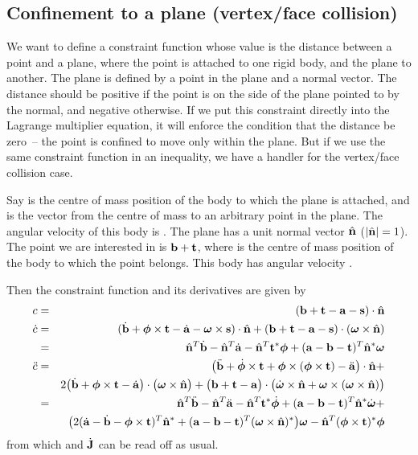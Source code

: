 \subsection{Confinement to a plane (vertex/face collision) \label{vertexFaceConstraint}}

We want to define a constraint function whose value is the distance between a point
and a plane, where the point is attached to one rigid body, and the plane to another. The plane
is defined by a point in the plane and a normal vector. The distance should be positive if the
point is on the side of the plane pointed to by the normal, and negative otherwise.
If we put this constraint directly into the Lagrange multiplier equation, it will enforce the
condition that the distance be zero~-- the point is confined to move only within the plane.
But if we use the same constraint function in an inequality, we have a handler for the
vertex/face collision case.

Say  is the centre of mass position of the body to which the plane is attached, and 
is the vector from the centre of mass to an arbitrary point in the plane. The angular velocity
of this body is \ve{\omega}. The plane has a unit normal vector $\hat{\ve{n}}$
($\norm{\hat{\ve{n}}} = 1$). The point we are interested in is $\ve{b} + \ve{t}$, where  is
the centre of mass position of the body to which the point belongs. This body has angular
velocity \ve{\phi}.

Then the constraint function and its derivatives are given by
\begin{eqnarray}
c &=& (\ve{b} + \ve{t} - \ve{a} - \ve{s})\cdot\hat{\ve{n}} \\
\dot{c} &=& (\dot{\ve{b}} + \ve{\phi}\times\ve{t} - \dot{\ve{a}} - \ve{\omega}\times\ve{s})
    \cdot\hat{\ve{n}} + (\ve{b} + \ve{t} - \ve{a} - \ve{s})\cdot(\ve{\omega}\times\hat{\ve{n}})
    \nonumber\\
&=& \hat{\ve{n}}^T\dot{\ve{b}} - \hat{\ve{n}}^T\dot{\ve{a}} - \hat{\ve{n}}^T\dual{\ve{t}}\ve{\phi}
    + (\ve{a} - \ve{b} - \ve{t})^T \dual{\hat{\ve{n}}} \ve{\omega} \\
\ddot{c} &=& \big( \ddot{\ve{b}} + \dot{\ve{\phi}}\times\ve{t} +
    \ve{\phi}\times(\ve{\phi}\times\ve{t}) - \ddot{\ve{a}} \big) \cdot \hat{\ve{n}}+\nonumber\\*&&
    2\big(\dot{\ve{b}} + \ve{\phi}\times\ve{t} - \dot{\ve{a}}\big)
    \cdot \big(\ve{\omega}\times\hat{\ve{n}}\big)
    + \big(\ve{b} + \ve{t} - \ve{a}\big) \cdot \big( \dot{\ve{\omega}}\times\hat{\ve{n}} +
    \ve{\omega}\times(\ve{\omega}\times\hat{\ve{n}}) \big) \nonumber\\
&=&  \hat{\ve{n}}^T \ddot{\ve{b}}
    -\hat{\ve{n}}^T \ddot{\ve{a}}
    -\hat{\ve{n}}^T\dual{\ve{t}} \dot{\ve{\phi}}
    +(\ve{a} - \ve{b} - \ve{t})^T \dual{\hat{\ve{n}}} \dot{\ve{\omega}} + \\*&&
    \big( 2(\dot{\ve{a}} - \dot{\ve{b}} - \ve{\phi}\times\ve{t})^T \dual{\hat{\ve{n}}} 
    +(\ve{a} - \ve{b} - \ve{t})^T \dual{(\ve{\omega}\times\hat{\ve{n}})}\big) \ve{\omega}
    -\hat{\ve{n}}^T\dual{(\ve{\phi}\times\ve{t})} \ve{\phi} \nonumber
\end{eqnarray}
from which  and $\dot{\m{J}}$ can be read off as usual.


